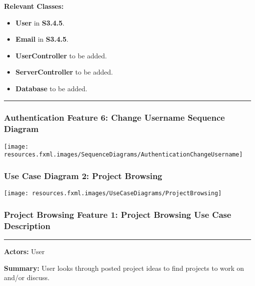 \documentclass[twoside,letterpaper]{article}
\begin{document}
\noindent\textbf{Relevant Classes:}
\begin{itemize}
	\item \textbf{User} in \textbf{S3.4.5}.
	\item \textbf{Email} in \textbf{S3.4.5}.
	\item \textbf{UserController} to be added.
	\item \textbf{ServerController} to be added.
	\item \textbf{Database} to be added.
\end{itemize}
\vspace{8pt}
\hrule
\newpage

\subsubsection[Authentication Feature 6: Change Username Sequence Diagram]{\rmfamily\bfseries\color{black}
	Authentication Feature 6: Change Username Sequence Diagram}
	\label{a:sd6}
\hypertarget{RefHeading22059017292}{}

\bigskip

\texttt{[image: resources.fxml.images/SequenceDiagrams/AuthenticationChangeUsername]}

\newpage

\subsubsection[Use Case Diagram 2: Project Browsing]{\rmfamily\bfseries\color{black}
Use Case Diagram 2: Project Browsing}

\texttt{[image: resources.fxml.images/UseCaseDiagrams/ProjectBrowsing]}

\newpage

\subsubsection[Project Browsing Feature 1: Project Browsing Use Case Description]{\rmfamily\bfseries\color{black}
Project Browsing Feature 1: Project Browsing Use Case Description}
\hypertarget{RefHeading22059017292}{}
\label{pb:uc1}

\vspace{2pt}
\hrule
\vspace{8pt}
\textbf{Actors:} User \newline

\noindent\textbf{Summary:} User looks through posted project ideas to find projects to work on and/or discuss. \newline
\end{document}
